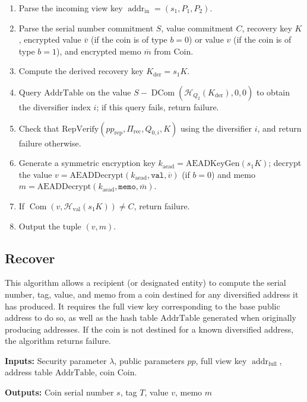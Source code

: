 \documentclass{llncs}
\newcommand{\hash}{\mathcal{H}}
\newcommand{\addr}{\operatorname{addr}}
\newcommand{\com}{\operatorname{Com}}
\newcommand{\dcom}{\operatorname{DCom}}
\begin{document}
\begin{enumerate}
\item Parse the incoming view key $\addr_{\text{in}} = (s_1, P_1, P_2)$.
\item Parse the serial number commitment $S$, value commitment $C$, recovery key $K$, encrypted value $\overline{v}$ (if the coin is of type $b=0$) or value $v$ (if the coin is of type $b=1$), and encrypted memo $\overline{m}$ from $\text{Coin}$.
\item Compute the derived recovery key $K_{\text{der}} = s_1 K$.
\item Query $\text{AddrTable}$ on the value $S - \dcom(\hash_{Q_2}(K_{\text{der}}),0,0)$ to obtain the diversifier index $i$; if this query fails, return failure.
\item Check that $\text{RepVerify}(pp_{\text{rep}},\Pi_{\text{rec}},Q_{0,i},K)$ using the diversifier $i$, and return failure otherwise.
\item Generate a symmetric encryption key $k_{\text{aead}} = \text{AEADKeyGen}(s_1 K)$; decrypt the value $v = \text{AEADDecrypt}(k_{\text{aead}},\texttt{val},\overline{v})$ (if $b=0$) and memo $m = \text{AEADDecrypt}(k_{\text{aead}},\texttt{memo},\overline{m})$.
\item If $\com(v,\hash_{\text{val}}(s_1 K)) \neq C$, return failure.
\item Output the tuple $(v, m)$.
\end{enumerate}


\subsection{Recover}

This algorithm allows a recipient (or designated entity) to compute the serial number, tag, value, and memo from a coin destined for any diversified address it has produced.
It requires the full view key corresponding to the base public address to do so, as well as the hash table $\text{AddrTable}$ generated when originally producing addresses.
If the coin is not destined for a known diversified address, the algorithm returns failure.

\textbf{Inputs:} Security parameter $\lambda$, public parameters $pp$, full view key $\addr_{\text{full}}$, address table $\text{AddrTable}$, coin $\text{Coin}$.

\textbf{Outputs:} Coin serial number $s$, tag $T$, value $v$, memo $m$
\end{document}
